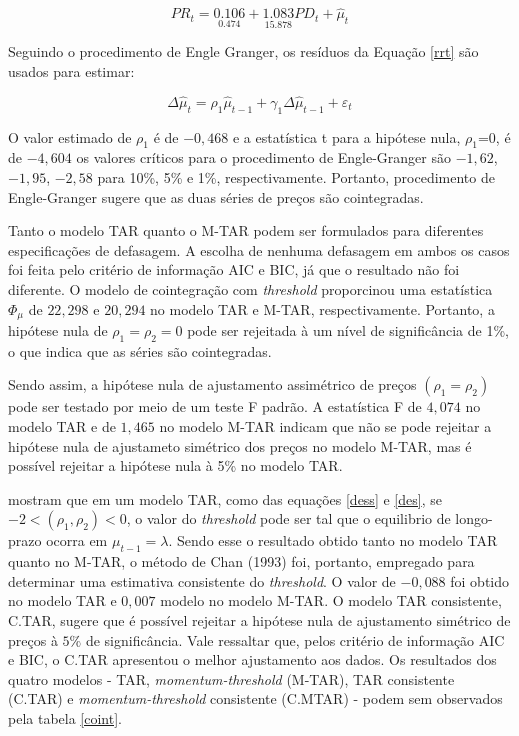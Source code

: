 \documentclass[
	article,			%
	12pt,				%
	openright,			%
	oneside,			%
	a4paper,			%
	english,			%
	brazil				%
	]{abntex2}
\begin{document}
\begin{equation} \label{rrt}
PR_{t} = \underset{0.474}{0.106} + \underset{15.878 }{1.083}PD_{t} + \widehat{\mu}_{t}
\end{equation}



Seguindo o procedimento de Engle Granger, os resíduos da Equação \ref{rrt} são usados para estimar:

\begin{equation} \label{res}
\Delta\widehat{\mu}_{t}=\rho_{1}\widehat{\mu}_{t-1}+\gamma_{1}\Delta\widehat{\mu}_{t-1}+ \varepsilon_{t} 
\end{equation}

O valor estimado de $\rho_{1}$ é de $ -0,468$ e a estatística t para a hipótese nula, $\rho_{1}$=0, é de $-4,604$ os valores críticos para o procedimento de Engle-Granger são  $-1,62$, $-1,95$,  $-2,58$ para 10\%, 5\% e 1\%, respectivamente. Portanto, procedimento de Engle-Granger sugere que as duas séries de preços são cointegradas.  

Tanto o modelo TAR quanto o M-TAR podem ser formulados para diferentes especificações de defasagem. A escolha de nenhuma defasagem em ambos os casos foi feita pelo critério de informação AIC e BIC, já que o resultado não foi diferente. O modelo de cointegração com \textit{threshold} proporcinou uma estatística $\Phi_\mu$ de $22,298$ e $20,294$  no modelo TAR e M-TAR, respectivamente. Portanto, a hipótese nula de $\rho_{1}=\rho_{2}=0$ pode ser rejeitada à um nível de significância de 1\%, o que indica que as séries são cointegradas.

Sendo assim, a hipótese nula de ajustamento assimétrico de preços $(\rho_{1}=\rho_{2})$ pode ser testado por meio de um teste F padrão. A estatística F de $4,074$ no modelo TAR e de $1,465$ no modelo M-TAR indicam que não se pode rejeitar a hipótese nula de ajustameto simétrico dos preços no modelo M-TAR, mas é possível rejeitar a hipótese nula à 5\% no modelo TAR. 

 mostram que em um modelo TAR, como das equações \ref{dess} e \ref{des}, se $-2< (\rho_{1}, \rho_{2})<0$, o valor do \textit{threshold} pode ser tal que o equilibrio de longo-prazo ocorra em $\mu_{t-1}=\lambda$. Sendo esse o resultado obtido tanto no modelo TAR quanto no M-TAR, o método de Chan (1993) foi, portanto, empregado para determinar uma estimativa consistente do \textit{threshold}. O valor de $-0,088$ foi obtido no modelo TAR e $0,007$ modelo no modelo M-TAR. O modelo TAR consistente, C.TAR, sugere que é possível rejeitar a hipótese nula de ajustamento simétrico de preços à $5\%$ de significância. Vale ressaltar que, pelos critério de informação AIC e BIC, o C.TAR apresentou o melhor ajustamento aos dados. Os resultados dos quatro modelos - TAR, \textit{momentum-threshold} (M-TAR), TAR consistente (C.TAR) e \textit{momentum-threshold} consistente (C.MTAR) -  podem sem observados pela tabela \ref{coint}.
\end{document}
